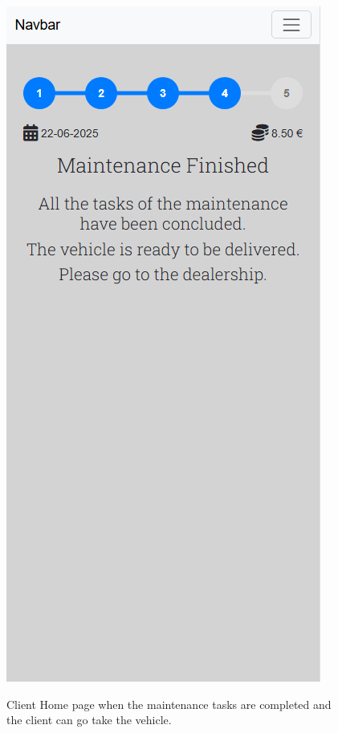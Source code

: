 \begin{figure}[htbp]
  \caption{Client Home page when the maintenance tasks are completed and the client can go take the vehicle.}
  \centering
  \includegraphics[width=\textwidth]{figs/Implementation/client/MaintenanceState4}
  \label{fig:MaintenanceState4}
\end{figure}


